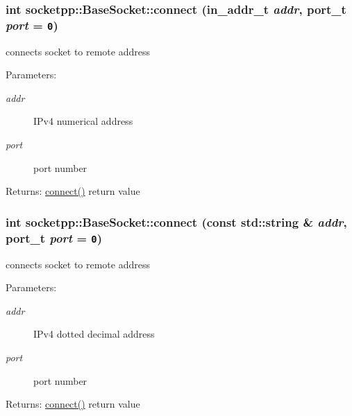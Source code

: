 \begin{CompactItemize}
{\subsubsection[{connect}]{\setlength{\rightskip}{0pt plus 5cm}int socketpp::BaseSocket::connect (in\_\-addr\_\-t {\em addr}, \/  {\bf port\_\-t} {\em port} = {\tt 0})}}
\label{classsocketpp_1_1BaseSocket_2bdd6d459e6f9cf2f71636b01787b250}


connects socket to remote address 

\begin{Desc}
\item[Parameters:]
\begin{description}
\item[{\em addr}]IPv4 numerical address \item[{\em port}]port number \end{description}
\end{Desc}
\begin{Desc}
\item[Returns:]\hyperlink{classsocketpp_1_1BaseSocket_769710192256606aaec1a776468d75fa}{connect()} return value \end{Desc}
\hypertarget{classsocketpp_1_1BaseSocket_769710192256606aaec1a776468d75fa}{
\subsubsection[{connect}]{\setlength{\rightskip}{0pt plus 5cm}int socketpp::BaseSocket::connect (const std::string \& {\em addr}, \/  {\bf port\_\-t} {\em port} = {\tt 0})}}
\label{classsocketpp_1_1BaseSocket_769710192256606aaec1a776468d75fa}


connects socket to remote address 

\begin{Desc}
\item[Parameters:]
\begin{description}
\item[{\em addr}]IPv4 dotted decimal address \item[{\em port}]port number \end{description}
\end{Desc}
\begin{Desc}
\item[Returns:]\hyperlink{classsocketpp_1_1BaseSocket_769710192256606aaec1a776468d75fa}{connect()} return value \end{Desc}
\hypertarget{classsocketpp_1_1BaseSocket_c96db07cc917926d895d89cf73734ea1}{
}
\end{CompactItemize}
